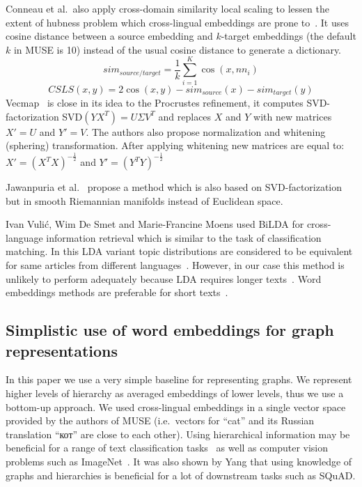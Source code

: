 \documentclass[11pt,a4paper]{article}
\begin{document}
Conneau et al.\ also apply cross-domain similarity local scaling to lessen the extent of hubness problem which cross-lingual embeddings are prone to~\cite{dinu}. It uses cosine distance between a source embedding and $k$-target embeddings (the default $k$ in MUSE is 10) instead of the usual cosine distance to generate a dictionary.
$$sim_{source/target} = \dfrac{1}{k}\sum_{i=1}^K\cos(x, nn_i)$$
\small
$$CSLS(x,y) = 2\cos(x,y) - sim_{source}(x)  - sim_{target}(y)$$
\normalsize
Vecmap~\cite{vecmap} is close in its idea to the Procrustes refinement, it computes SVD-factorization SVD$(YX^T) = U\Sigma V^T$ and replaces $X$ and $Y$ with new matrices $X' = U$ and $Y' = V$. The authors also propose normalization and whitening (sphering) transformation. After applying whitening new matrices are equal to:
$X' = {({X^T}X)}^{-\tfrac{1}{2}}$ and $Y' = {({Y^T}Y)}^{-\tfrac{1}{2}}$

Jawanpuria et al.~\cite{jawanpuria} propose a method which is also based on SVD-factorization but in smooth Riemannian manifolds instead of Euclidean space.

Ivan Vulić, Wim De Smet and Marie-Francine Moens  used BiLDA for cross-language information retrieval which is similar to the task of classification matching. In this LDA variant topic distributions are considered to be equivalent for same articles from different languages~\cite{bilda}. However, in our case this method is unlikely to perform adequately because LDA requires longer texts~\cite{short-lda}. Word embeddings methods are preferable for short texts~\cite{maslova-potapov}.

\subsection{Simplistic use of word embeddings for graph representations}
In this paper we use a very simple baseline for representing graphs. We represent higher levels of hierarchy as averaged embeddings of lower levels, thus we use a bottom-up approach. We used cross-lingual embeddings in a single vector space provided by the authors of MUSE (i.e.\ vectors for ``cat'' and its Russian translation \foreignlanguage{russian}{``кот''} are close to each other). Using hierarchical information may be beneficial for a range of text classification tasks~\cite{tax2vec} as well as computer vision problems such as ImageNet~\cite{hedging-bets}. It was also shown by Yang \citeyearpar{glomo} that using knowledge of graphs and hierarchies is beneficial for a lot of downstream tasks such as SQuAD.
\end{document}
